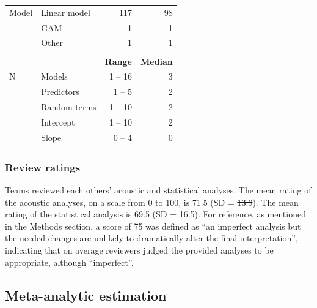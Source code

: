 \documentclass[Review,times,sageh]{sagej}
\providecommand{\DIFaddtex}[1]{{\protect\color{blue}\uwave{#1}}} %
\providecommand{\DIFdeltex}[1]{{\protect\color{red}\sout{#1}}}                      %
\providecommand{\DIFaddbegin}{} %
\providecommand{\DIFaddend}{} %
\providecommand{\DIFdelbegin}{} %
\providecommand{\DIFdelend}{} %
\providecommand{\DIFaddendFL}{} %
\providecommand{\DIFadd}[1]{\texorpdfstring{\DIFaddtex{#1}}{#1}} %
\providecommand{\DIFdel}[1]{\texorpdfstring{\DIFdeltex{#1}}{}} %
\begin{document}
\begin{table}
{\begin{tabular}[t]{llrr}
\hspace{1em}Model & Linear model & 117 & 98\\
 & GAM & 1 & 1\\
 & Other & 1 & 1\\
 &  &  & \\
 &  & \bf{Range} & \bf{Median}\\
\hspace{1em}N & Models & 1 -- 16 & 3\\
 & Predictors & 1 -- 5 & 2\\
 & Random terms & 1 -- 10 & 2\\
\hspace{1em} & \hspace{1em}Intercept & \hspace{1em}1 -- 10 & \hspace{1em}2\\
\hspace{1em} & \hspace{1em}Slope & \hspace{1em}0 -- 4 & \hspace{1em}0\\
\bottomrule
\end{tabular}}
\DIFaddendFL \end{table}

\hypertarget{review-ratings}{%
\subsubsection{Review ratings}\label{review-ratings}}

Teams reviewed each others' acoustic and statistical analyses.
The mean rating of the acoustic analyses, on a scale from 0 to 100, is 71.5 (SD = \DIFdelbegin \DIFdel{13.9}\DIFdelend \DIFaddbegin \DIFadd{13.5}\DIFaddend ).
The mean rating of the statistical analysis is \DIFdelbegin \DIFdel{69.5 }\DIFdelend \DIFaddbegin \DIFadd{69.4 }\DIFaddend (SD = \DIFdelbegin \DIFdel{16.5}\DIFdelend \DIFaddbegin \DIFadd{15.9}\DIFaddend ).
For reference, as mentioned in the Methods section, a score of 75 was defined as ``an imperfect analysis but the needed changes are unlikely to dramatically alter the final interpretation'', indicating that on average reviewers judged the provided analyses to be appropriate, although ``imperfect''.

\hypertarget{meta-est-2}{%
\subsection{Meta-analytic estimation}\label{meta-est-2}}
\end{document}
